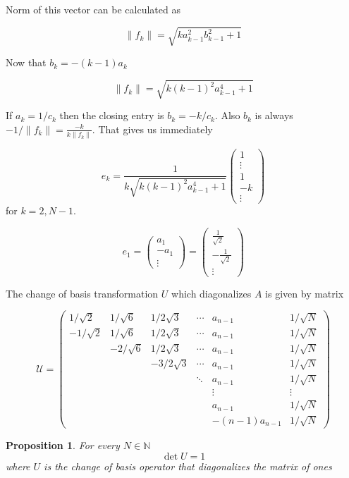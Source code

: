 \documentclass{article}
\newtheorem{propos}{Proposition}
\providecommand{\NN}{\mathbb{N}}
\begin{document}
Norm of this vector can be calculated as

\providecommand{\fknorm}{\sqrt{k a_{k-1}^2 b_{k-1}^2 + 1}}
$$\|f_k\| = \fknorm$$

Now that $b_k = -(k-1)a_k$

\renewcommand{\fknorm}{\sqrt{k(k-1)^2 a_{k-1}^4 + 1}}
$$\|f_k\| = \fknorm$$

If $a_k = 1/c_k$ then the closing entry is $b_k = -k/c_k$.
Also $b_k$ is always $-1/\|f_k\| = \frac{-k}{k\|f_k\|}$.
That gives us immediately

$$e_k =
\frac{1}{k\fknorm}
\begin{pmatrix}1 \\ \vdots \\ 1 \\ -k \\ \vdots\end{pmatrix}$$
for $k=2,N-1$.

$$e_1
    = \begin{pmatrix}a_1 \\ -a_1 \\ \vdots \end{pmatrix}
    = \begin{pmatrix}\frac1{\sqrt2} \\ - \frac{1}{\sqrt2} \\ \vdots \end{pmatrix}$$

The change of basis transformation $U$ which diagonalizes $A$ is given by matrix

    $$\mathcal U =
    \begin{pmatrix}
         1/\sqrt2 & 1/\sqrt6  & 1/2\sqrt3  & \cdots & a_{n-1} & 1/\sqrt N \\
        -1/\sqrt2 & 1/\sqrt6  & 1/2\sqrt3  & \cdots & a_{n-1} & 1/\sqrt N \\
                  & -2/\sqrt6 & 1/2\sqrt3  & \cdots & a_{n-1} & 1/\sqrt N \\
                  &           & -3/2\sqrt3 & \cdots & a_{n-1} & 1/\sqrt N \\
                  &           &            & \ddots & a_{n-1} & 1/\sqrt N \\
                  &           &            &        & \vdots  & \vdots    \\
                  &           &            &        & a_{n-1} & 1/\sqrt N \\
                  &           &            &        & -(n-1)a_{n-1} & 1/\sqrt N
    \end{pmatrix}$$

\begin{propos}
    For every $N\in\NN$
    $$\det U = 1$$
    where $U$ is the change of basis operator
    that diagonalizes the matrix of ones

\end{propos}
\end{document}
